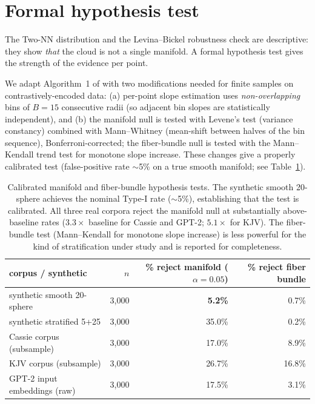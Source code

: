 \documentclass[11pt,a4paper]{article}
\theoremstyle{definition}
\begin{document}
\section{Formal hypothesis test}
\label{sec:formal-test}

The Two-NN distribution and the Levina--Bickel robustness check are
descriptive: they show \emph{that} the cloud is not a single manifold.
A formal hypothesis test gives the strength of the evidence per point.

We adapt Algorithm~1 of \cite{robinson2025token} with two modifications
needed for finite samples on contrastively-encoded data: (a) per-point
slope estimation uses \emph{non-overlapping} bins of $B=15$ consecutive
radii (so adjacent bin slopes are statistically independent), and (b)
the manifold null is tested with Levene's test (variance constancy)
combined with Mann--Whitney (mean-shift between halves of the bin
sequence), Bonferroni-corrected; the fiber-bundle null is tested with
the Mann--Kendall trend test for monotone slope increase. These changes
give a properly calibrated test (false-positive rate $\sim$5\% on a
true smooth manifold; see Table~\ref{tab:calibrated}).

\begin{table}[H]
\centering
\small
\begin{tabular}{l r r r}
\toprule
corpus / synthetic & $n$ & \% reject manifold ($\alpha=0.05$) & \% reject fiber bundle \\
\midrule
synthetic smooth 20-sphere    & 3{,}000 & \textbf{5.2\%}  & 0.7\% \\
synthetic stratified 5+25     & 3{,}000 & 35.0\% & 0.2\% \\
\midrule
Cassie corpus (subsample)     & 3{,}000 & 17.0\% & 8.9\% \\
KJV corpus (subsample)        & 3{,}000 & 26.7\% & 16.8\% \\
GPT-2 input embeddings (raw)  & 3{,}000 & 17.5\% & 3.1\% \\
\bottomrule
\end{tabular}
\caption{Calibrated manifold and fiber-bundle hypothesis tests.
The synthetic smooth 20-sphere achieves the nominal Type-I rate
($\sim$5\%), establishing that the test is calibrated. All three real
corpora reject the manifold null at substantially above-baseline
rates ($3.3\times$ baseline for Cassie and GPT-2; $5.1\times$ for
KJV). The fiber-bundle test (Mann--Kendall for monotone slope
increase) is less powerful for the kind of stratification under study
and is reported for completeness.}
\label{tab:calibrated}
\end{table}
\end{document}
